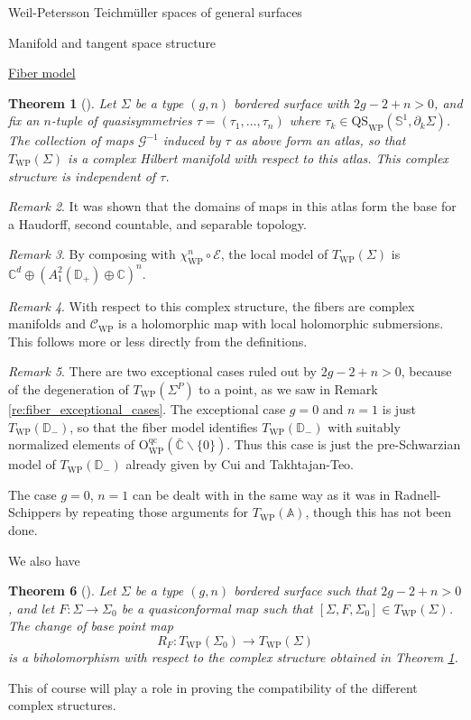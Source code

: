 \documentclass[12pt]{amsart}
\newcommand{\disk}{\ensuremath{\mathbb{D}} } %
\newcommand{\sphere}{\bar{\Bbb{C}}} %
\newcommand{\riem}{\Sigma}  %
\renewcommand{\Bbb}[1]{\ensuremath{\mathbb{#1}}}
\theoremstyle{plain}
\newtheorem{theorem}{Theorem}[section]
\theoremstyle{definition}
\theoremstyle{remark}
\newtheorem{remark}[theorem]{Remark}
\numberwithin{equation}{section} %
\numberwithin{figure}{section} %
\begin{document}
\begin{section}{Weil-Petersson Teichm\"uller spaces of general surfaces}
\begin{subsection}{Manifold and tangent space structure}
\begin{subsubsection}{{\underline{Fiber model}}}
\begin{theorem}[\cite{RSS_Filbert2}]  \label{th:us_WP_atlas_fiber} Let $\riem$ be a type $(g,n)$ bordered surface with $2g-2+n>0$, and fix an $n$-tuple of quasisymmetries $\tau=(\tau_1,\ldots,\tau_n)$ where $\tau_k \in \mathrm{QS}_{\mathrm{WP}}(\mathbb{S}^1,\partial_k \riem)$. 
 The collection of maps $\mathcal{G}^{-1}$ induced by $\tau$ as above form an atlas, so that $T_{\mathrm{WP}}(\riem)$ is a complex Hilbert manifold with respect to this atlas.  This complex structure is independent of $\tau$.  
\end{theorem}
\begin{remark} It was shown that the domains of maps in this  atlas form the base for a Haudorff, second countable, and separable topology. 
\end{remark}
\begin{remark}
    By composing with $\chi^n_{\mathrm{WP}} \circ \mathcal{E}$, the local model of $T_{\mathrm{WP}}(\riem)$ is $\mathbb{C}^d \oplus \left( A_1^2(\disk_+) \oplus \mathbb{C} \right)^n$. 
\end{remark}
\begin{remark} With respect to this complex structure, the fibers are complex manifolds and $\mathcal{C}_{\mathrm{WP}}$ is a holomorphic map with local holomorphic submersions. This follows more or less directly from the definitions. 
\end{remark}
\begin{remark} There are two exceptional cases ruled out by $2g -2+n>0$, because of the degeneration of $T_{\mathrm{WP}}(\riem^P)$ to a point, as we saw in Remark \ref{re:fiber_exceptional_cases}. The exceptional case $g=0$ and $n=1$ is just $T_{\mathrm{WP}}(\disk_-)$, so that the fiber model identifies $T_{\mathrm{WP}}(\disk_-)$ with suitably normalized elements of $\mathrm{O}^{\mathrm{qc}}_{\mathrm{WP}}(\sphere \backslash \{0\})$. Thus this case is just the pre-Schwarzian model of  $T_{\mathrm{WP}}(\disk_-)$ already given by Cui and Takhtajan-Teo. 

The case $g=0$, $n=1$ can be dealt with in the same way as it was in Radnell-Schippers \cite{RadnellSchippers_annulus} by repeating those arguments for $T_{\mathrm{WP}}(\mathbb{A})$, though this has not been done.
\end{remark}

We also have 
\begin{theorem}[\cite{RSS_Filbert2}] \label{th:change_of_base_holo_fiber} 
 Let $\riem$ be a type $(g,n)$ bordered surface such that $2g-2+n>0$, and let $F:\riem \rightarrow \riem_0$ be a quasiconformal map such that $[\riem,F,\riem_0] \in T_{\mathrm{WP}}(\riem)$. The change of base point map \[ R_F:T_{\mathrm{WP}}(\riem_0) \rightarrow T_{\mathrm{WP}}(\riem) \]
 is a biholomorphism with respect to the complex structure obtained in \emph{Theorem \ref{th:us_WP_atlas_fiber}}.  
\end{theorem}
This of course will play a role in proving the compatibility of the different complex structures.


\end{subsubsection}
\end{subsection}
\end{section}
\end{document}
